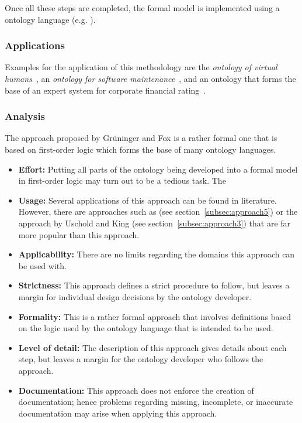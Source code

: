 Once all these steps are completed, the formal model is implemented using a ontology language (e.g. ).

\subsubsection{Applications}

Examples for the application of this methodology are the \emph{ontology of virtual humans}~\cite{tove_example1}, an \emph{ontology for software maintenance}~\cite{tove_example2}, and an ontology that forms the base of an expert system for corporate financial rating~\cite{tove_example3}.

\subsubsection{Analysis}

The approach proposed by Grüninger and Fox is a rather formal one that is based on first-order logic which forms the base of many ontology languages.

\begin{itemize}
  \item \textbf{Effort:} Putting all parts of the ontology being developed into a formal model in first-order logic may turn out to be a tedious task. The %
  
  \item \textbf{Usage:} Several applications of this approach can be found in literature. However, there are approaches such as \methontology (see section~\ref{subsec:approach5}) or the approach by Uschold and King (see section~\ref{subsec:approach3}) that are far more popular than this approach.
  
  \item \textbf{Applicability:} There are no limits regarding the domains this approach can be used with.
  
  \item \textbf{Strictness:} This approach defines a strict procedure to follow, but leaves a margin for individual design decisions by the ontology developer.
  
  \item \textbf{Formality:} This is a rather formal approach that involves definitions based on the logic used by the ontology language that is intended to be used.
  
  \item \textbf{Level of detail:} The description of this approach gives details about each step, but leaves a margin for the ontology developer who follows the approach.
  
  \item \textbf{Documentation:} This approach does not enforce the creation of documentation; hence problems regarding missing, incomplete, or inaccurate documentation may arise when applying this approach.
\end{itemize}

